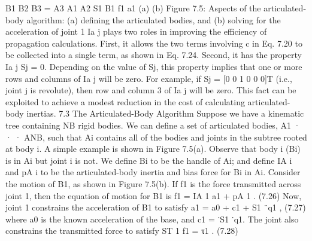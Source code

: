 B1 B2 B3 = A3 A1 A2 S1 B1 f1 a1 (a) (b) Figure 7.5: Aspects of the articulated-body algorithm: (a) defining the articulated bodies, and (b) solving for the acceleration of joint 1 Ia j plays two roles in improving the efficiency of propagation calculations. First, it allows the two terms involving c in Eq. 7.20 to be collected into a single term, as shown in Eq. 7.24. Second, it has the property Ia j Sj = 0. Depending on the value of Sj, this property implies that one or more rows and columns of Ia j will be zero. For example, if Sj = [0 0 1 0 0 0]T (i.e., joint j is revolute), then row and column 3 of Ia j will be zero. This fact can be exploited to achieve a modest reduction in the cost of calculating articulated-body inertias. 7.3 The Articulated-Body Algorithm Suppose we have a kinematic tree containing NB rigid bodies. We can define a set of articulated bodies, A1 · · · ANB, such that Ai contains all of the bodies and joints in the subtree rooted at body i. A simple example is shown in Figure 7.5(a). Observe that body i (Bi) is in Ai but joint i is not. We define Bi to be the handle of Ai; and define IA i and pA i to be the articulated-body inertia and bias force for Bi in Ai. Consider the motion of B1, as shown in Figure 7.5(b). If f1 is the force transmitted across joint 1, then the equation of motion for B1 is f1 = IA 1 a1 + pA 1 . (7.26) Now, joint 1 constrains the acceleration of B1 to satisfy a1 = a0 + c1 + S1 ¨q1 , (7.27) where a0 is the known acceleration of the base, and c1 = ˙S1 ˙q1. The joint also constrains the transmitted force to satisfy ST 1 f1 = τ1 . (7.28)

